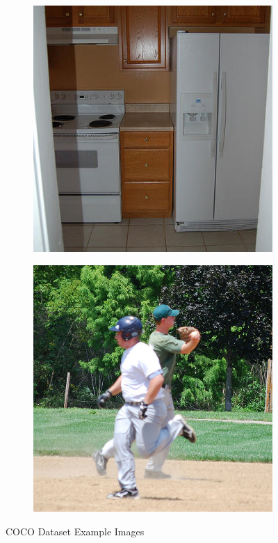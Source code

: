 \begin{figure}[H]
    \centering
    \begin{subfigure}{0.49\textwidth}
        \centering
        \includegraphics[width=\textwidth]{Images/External_datasets/coco_1_cropped.jpg}
    \end{subfigure}
    \hfill
    \begin{subfigure}{0.49\textwidth}
        \centering
        \includegraphics[width=\textwidth]{Images/External_datasets/coco_2.jpg}
    \end{subfigure}
    \caption{\centering COCO Dataset Example Images}
    \label{fig:COCO_examples}
\end{figure}

